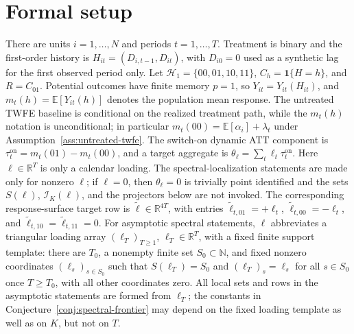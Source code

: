 \documentclass[11pt]{article}
\newcommand{\E}{\mathbb{E}}
\newcommand{\one}{\mathbf{1}}
\theoremstyle{definition}
\theoremstyle{plain}
\theoremstyle{remark}
\begin{document}
\section{Formal setup}
There are units \(i=1,\ldots,N\) and periods \(t=1,\ldots,T\).
Treatment is binary and the first-order history is \(H_{it}=(D_{i,t-1},D_{it})\), with \(D_{i0}=0\) used as a synthetic lag for the first observed period only.
Let \(\mathcal H_1=\{00,01,10,11\}\), \(C_h=\one\{H=h\}\), and \(R=C_{01}\).
Potential outcomes have finite memory \(p=1\), so \(Y_{it}=Y_{it}(H_{it})\), and \(m_t(h)=\E[Y_{it}(h)]\) denotes the population mean response.
The untreated TWFE baseline is conditional on the realized treatment path, while the \(m_t(h)\) notation is unconditional; in particular \(m_t(00)=\E[\alpha_i]+\lambda_t\) under Assumption~\ref{ass:untreated-twfe}.
The switch-on dynamic ATT component is \(\tau^{\mathrm{on}}_t=m_t(01)-m_t(00)\), and a target aggregate is \(\theta_\ell=\sum_t \ell_t\tau^{\mathrm{on}}_t\).
Here \(\ell\in\mathbb R^T\) is only a calendar loading.
The spectral-localization statements are made only for nonzero \(\ell\); if \(\ell=0\), then \(\theta_\ell=0\) is trivially point identified and the sets \(S(\ell)\), \(\mathcal I_K(\ell)\), and the projectors below are not invoked.
The corresponding response-surface target row is \(\widetilde\ell\in\mathbb R^{4T}\), with entries \(\widetilde\ell_{t,01}=+\ell_t\), \(\widetilde\ell_{t,00}=-\ell_t\), and \(\widetilde\ell_{t,10}=\widetilde\ell_{t,11}=0\).
For asymptotic spectral statements, \(\ell\) abbreviates a triangular loading array \((\ell_T)_{T\ge1}\), \(\ell_T\in\mathbb R^T\), with a fixed finite support template: there are \(T_0\), a nonempty finite set \(S_0\subset\mathbb N\), and fixed nonzero coordinates \((\ell_s)_{s\in S_0}\) such that \(S(\ell_T)=S_0\) and \((\ell_T)_s=\ell_s\) for all \(s\in S_0\) once \(T\ge T_0\), with all other coordinates zero.
All local sets and rows in the asymptotic statements are formed from \(\ell_T\); the constants in Conjecture~\ref{conj:spectral-frontier} may depend on the fixed loading template as well as on \(K\), but not on \(T\).
\end{document}

